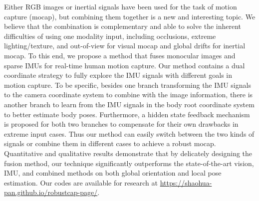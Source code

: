 Either RGB images or inertial signals have been used for the task of motion capture (mocap), but combining them together is a new and interesting topic.
%
We believe that the combination is complementary and able to solve the inherent difficulties of using one modality input, including occlusions, extreme lighting/texture, and out-of-view for visual mocap and global drifts for inertial mocap.
%
To this end, we propose a method that fuses monocular images and sparse IMUs for real-time human motion capture.
%
Our method contains a dual coordinate strategy to fully explore the IMU signals with different goals in motion capture.
%
To be specific, besides one branch transforming the IMU signals to the camera coordinate system to combine with the image information, there is another branch to learn from the IMU signals in the body root coordinate system to better estimate body poses.
%
Furthermore, a hidden state feedback mechanism is proposed for both two branches to compensate for their own drawbacks in extreme input cases. 
%
Thus our method can easily switch between the two kinds of signals or combine them in different cases to achieve a robust mocap.
%
%
Quantitative and qualitative results demonstrate that by delicately designing the fusion method, our technique significantly outperforms the state-of-the-art vision, IMU, and combined methods on both global orientation and local pose estimation.
%
Our codes are available for research at \url{https://shaohua-pan.github.io/robustcap-page/}.